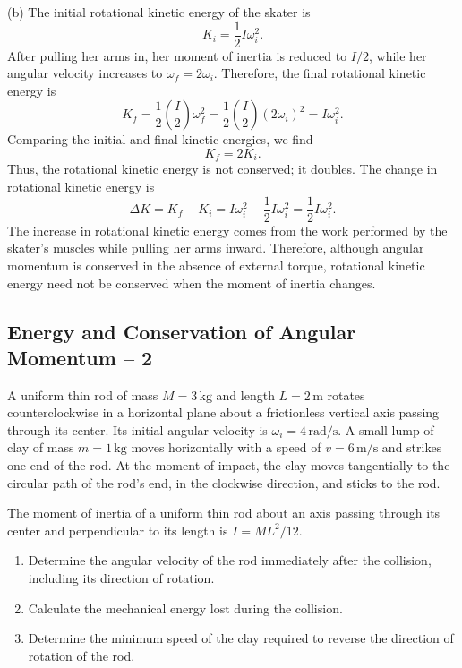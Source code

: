\documentclass[../main.tex]{subfiles}
\begin{document}
(b) The initial rotational kinetic energy of the skater is
\begin{equation}
    K_i=\frac{1}{2}I\omega_i^2.
\end{equation}
After pulling her arms in, her moment of inertia is reduced to $I/2$, while her angular velocity increases to $\omega_f=2\omega_i$. Therefore, the final rotational kinetic energy is
\begin{equation}
    K_f=\frac{1}{2}\left(\frac{I}{2}\right)\omega_f^2
    =\frac{1}{2}\left(\frac{I}{2}\right)(2\omega_i)^2
    =I\omega_i^2.
\end{equation}
Comparing the initial and final kinetic energies, we find
\begin{equation}
    \boxed{K_f=2K_i}.
\end{equation}
Thus, the rotational kinetic energy is not conserved; it doubles. The change in rotational kinetic energy is
\begin{equation}
    \Delta K=K_f-K_i
    =I\omega_i^2-\frac{1}{2}I\omega_i^2
    =\boxed{\frac{1}{2}I\omega_i^2}.
\end{equation}
The increase in rotational kinetic energy comes from the work performed by the skater's muscles while pulling her arms inward. Therefore, although angular momentum is conserved in the absence of external torque, rotational kinetic energy need not be conserved when the moment of inertia changes.

\subsection{Energy and Conservation of Angular Momentum -- 2}

A uniform thin rod of mass $M=3\,\mathrm{kg}$ and length
$L=2\,\mathrm{m}$ rotates counterclockwise in a horizontal
plane about a frictionless vertical axis passing through
its center. Its initial angular velocity is
$\omega_i=4\,\mathrm{rad/s}$. A small lump of clay of mass
$m=1\,\mathrm{kg}$ moves horizontally with a speed of
$v=6\,\mathrm{m/s}$ and strikes one end of the rod.
At the moment of impact, the clay moves tangentially
to the circular path of the rod's end, in the clockwise
direction, and sticks to the rod.

The moment of inertia of a uniform thin rod about an
axis passing through its center and perpendicular to
its length is $I=ML^2/12$.

\begin{enumerate}
    \item[(a)] Determine the angular velocity of the
    rod immediately after the collision, including
    its direction of rotation.
    \item[(b)] Calculate the mechanical energy lost
    during the collision.
    \item[(c)] Determine the minimum speed of the clay
    required to reverse the direction of rotation
    of the rod.
\end{enumerate}
\end{document}

